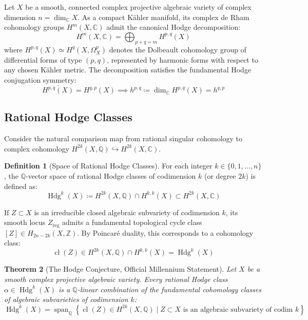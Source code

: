 \documentclass[11pt,a4paper]{article}
\newtheorem{theorem}{Theorem}[section]
\theoremstyle{definition}
\newtheorem{definition}[theorem]{Definition}
\begin{document}
Let $X$ be a smooth, connected complex projective algebraic variety of complex dimension $n = \dim_{\mathbb{C}} X$. As a compact Kähler manifold, its complex de Rham cohomology groups $H^m(X, \mathbb{C})$ admit the canonical Hodge decomposition:
\begin{equation}
H^m(X, \mathbb{C}) = \bigoplus_{p+q=m} H^{p,q}(X)
\end{equation}
where $H^{p,q}(X) \simeq H^q(X, \Omega_X^p)$ denotes the Dolbeault cohomology group of differential forms of type $(p,q)$, represented by harmonic forms with respect to any chosen Kähler metric. The decomposition satisfies the fundamental Hodge conjugation symmetry:
\begin{equation}
\overline{H^{p,q}(X)} = H^{q,p}(X) \implies h^{p,q} \coloneqq \dim_{\mathbb{C}} H^{p,q}(X) = h^{q,p}
\end{equation}

\subsection{Rational Hodge Classes}
Consider the natural comparison map from rational singular cohomology to complex cohomology $H^{2k}(X, \mathbb{Q}) \hookrightarrow H^{2k}(X, \mathbb{C})$.
\begin{definition}[Space of Rational Hodge Classes]
For each integer $k \in \{0, 1, \dots, n\}$, the $\mathbb{Q}$-vector space of rational Hodge classes of codimension $k$ (or degree $2k$) is defined as:
\begin{equation}
\operatorname{Hdg}^k(X) \coloneqq H^{2k}(X, \mathbb{Q}) \cap H^{k,k}(X) \subset H^{2k}(X, \mathbb{C})
\end{equation}
\end{definition}

If $Z \subset X$ is an irreducible closed algebraic subvariety of codimension $k$, its smooth locus $Z_{\mathrm{reg}}$ admits a fundamental topological cycle class $[Z] \in H_{2n-2k}(X, \mathbb{Z})$. By Poincaré duality, this corresponds to a cohomology class:
\begin{equation}
\operatorname{cl}(Z) \in H^{2k}(X, \mathbb{Q}) \cap H^{k,k}(X) = \operatorname{Hdg}^k(X)
\end{equation}

\begin{theorem}[The Hodge Conjecture, Official Millennium Statement]
Let $X$ be a smooth complex projective algebraic variety. Every rational Hodge class $\alpha \in \operatorname{Hdg}^k(X)$ is a $\mathbb{Q}$-linear combination of the fundamental cohomology classes of algebraic subvarieties of codimension $k$:
\begin{equation}
\operatorname{Hdg}^k(X) = \operatorname{span}_{\mathbb{Q}} \left\{ \operatorname{cl}(Z) \in H^{2k}(X, \mathbb{Q}) \mid Z \subset X \text{ is an algebraic subvariety of codim } k \right\}
\end{equation}
\end{theorem}
\end{document}
